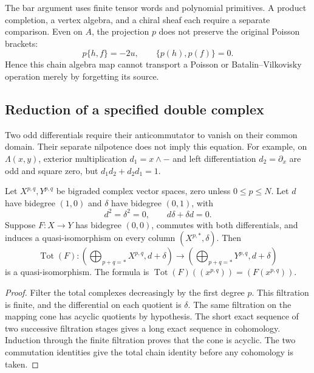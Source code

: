 The bar argument uses finite tensor words and polynomial primitives.
A product completion, a vertex algebra, and a chiral sheaf each require a separate comparison.
Even on $A$, the projection $p$ does not preserve the original Poisson brackets:
\[
 p\{h,f\}=-2u,\qquad \{p(h),p(f)\}=0.
\]
Hence this chain algebra map cannot transport a Poisson or Batalin--Vilkovisky operation merely by forgetting its source.

\subsection{Reduction of a specified double complex}

Two odd differentials require their anticommutator to vanish on their common domain.
Their separate nilpotence does not imply this equation.
For example, on $\Lambda(x,y)$, exterior multiplication $d_1=x\wedge-$ and left differentiation $d_2=\partial_x$ are odd and square zero, but
$d_1d_2+d_2d_1=1$.

\begin{theorem}
\label{thm:bar-semi-infinite-w}
Let $X^{p,q},Y^{p,q}$ be bigraded complex vector spaces, zero unless $0\leq p\leq N$.
Let $d$ have bidegree $(1,0)$ and $\delta$ have bidegree $(0,1)$, with
\[
 d^2=\delta^2=0,\qquad d\delta+\delta d=0.
\]
Suppose $F:X\to Y$ has bidegree $(0,0)$, commutes with both differentials, and induces a quasi-isomorphism on every column $(X^{p,*},\delta)$.
Then
\begin{equation}\label{eq:bar-semi-infinite-w}
 \operatorname{Tot}(F):
 \left(\bigoplus_{p+q=*}X^{p,q},d+\delta\right)
 \longrightarrow
 \left(\bigoplus_{p+q=*}Y^{p,q},d+\delta\right)
\end{equation}
is a quasi-isomorphism.
The formula is $\operatorname{Tot}(F)((x^{p,q}))=(F(x^{p,q}))$.
\end{theorem}

\begin{proof}
Filter the total complexes decreasingly by the first degree $p$.
This filtration is finite, and the differential on each quotient is $\delta$.
The same filtration on the mapping cone has acyclic quotients by hypothesis.
The short exact sequence of two successive filtration stages gives a long exact sequence in cohomology.
Induction through the finite filtration proves that the cone is acyclic.
The two commutation identities give the total chain identity before any cohomology is taken.
\end{proof}

